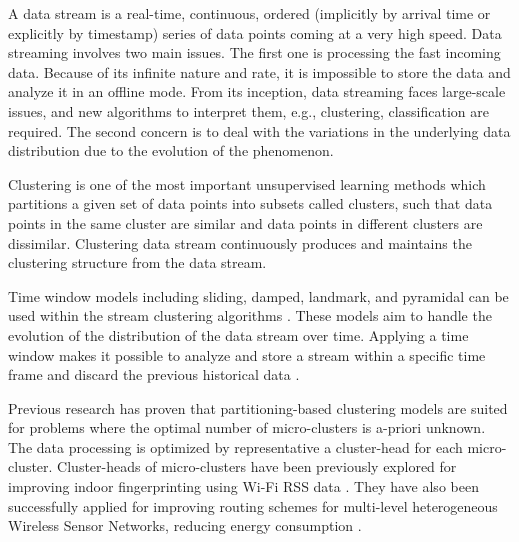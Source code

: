 A data stream is a real-time, continuous, ordered (implicitly by arrival time or explicitly by timestamp) series of data points coming at a very high speed. Data streaming involves two main issues. The first one is processing the fast incoming data. Because of its infinite nature and rate, it is impossible to store the data and analyze it in an offline mode. From its inception, data streaming faces large-scale issues, and new algorithms to interpret them, e.g., clustering, classification are required.
The second concern is to deal with the variations in the underlying data distribution due to the evolution of the phenomenon.

Clustering is one of the most important unsupervised learning methods which partitions a given set of data points into subsets called clusters, such that data points in the same cluster are similar and data points in different clusters are dissimilar. Clustering data stream continuously produces and maintains the clustering structure from the data stream.

Time window models including sliding, damped, landmark, and pyramidal can be used within the stream clustering algorithms  \cite{nguyen2015survey}. These models aim to handle the evolution of the distribution of the data stream over time. Applying a time window makes it possible to analyze and store a stream within a specific time frame and discard the previous historical data \cite{mansalis2018evaluation}.

Previous research has proven that partitioning-based clustering models are suited for problems where the optimal number of micro-clusters is a-priori unknown. The data processing is optimized by representative a cluster-head for each micro-cluster. Cluster-heads of micro-clusters have been previously explored for improving indoor fingerprinting using Wi-Fi RSS data \cite{hu2015improving, subedi2019improving}. They have also been successfully applied for improving routing schemes for multi-level heterogeneous Wireless Sensor Networks, reducing energy consumption \cite{wang2019affinity}. 

